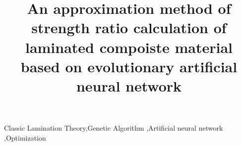 \documentclass[review]{elsarticle}
\begin{document}
\begin{frontmatter}

\title{An approximation method of strength ratio calculation of laminated compoiste material based on evolutionary artificial neural network}





\begin{abstract}

\end{abstract}

\begin{keyword}
Classic Lamination Theory\sep Genetic Algorithm \sep Artificial neural network
\sep Optimization
\end{keyword}

\end{frontmatter}














\end{document}
